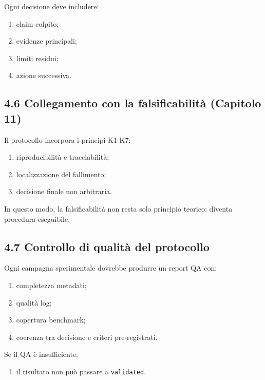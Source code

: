 Ogni decisione deve includere:

\begin{enumerate}
\def\labelenumi{\arabic{enumi}.}
\tightlist
\item
  claim colpito;
\item
  evidenze principali;
\item
  limiti residui;
\item
  azione successiva.
\end{enumerate}

\subsection{4.6 Collegamento con la falsificabilità (Capitolo 11)}

Il protocollo incorpora i principi K1-K7:

\begin{enumerate}
\def\labelenumi{\arabic{enumi}.}
\tightlist
\item
  riproducibilità e tracciabilità;
\item
  localizzazione del fallimento;
\item
  decisione finale non arbitraria.
\end{enumerate}

In questo modo, la falsificabilità non resta solo principio teorico: diventa procedura eseguibile.

\subsection{4.7 Controllo di qualità del protocollo}

Ogni campagna sperimentale dovrebbe produrre un report QA con:

\begin{enumerate}
\def\labelenumi{\arabic{enumi}.}
\tightlist
\item
  completezza metadati;
\item
  qualità log;
\item
  copertura benchmark;
\item
  coerenza tra decisione e criteri pre-registrati.
\end{enumerate}

Se il QA è insufficiente:

\begin{enumerate}
\def\labelenumi{\arabic{enumi}.}
\tightlist
\item
  il risultato non può passare a \texttt{validated}.
\end{enumerate}

